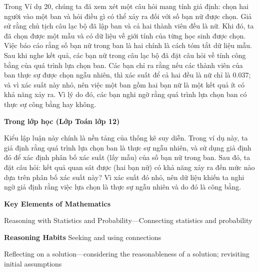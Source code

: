 \documentclass[
  10pt,
  a4paper,
  landscape,
  twoside,
  openany
]{scrbook}
\begin{document}
{
Trong Ví dụ 20, chúng ta đã xem xét một câu hỏi mang tính giả định: chọn hai người vào một ban và hỏi điều gì có thể xảy ra đối với số bạn nữ được chọn. Giả sử rằng chủ tịch câu lạc bộ đã lập ban và cả hai thành viên đều là nữ. Khi đó, ta đã chọn được một mẫu và có dữ liệu về giới tính của từng học sinh được chọn. Việc báo cáo rằng số bạn nữ trong ban là hai chính là cách tóm tắt dữ liệu mẫu. Sau khi nghe kết quả, các bạn nữ trong câu lạc bộ đã đặt câu hỏi về tính công bằng của quá trình lựa chọn ban. Các bạn chỉ ra rằng nếu các thành viên của ban thực sự được chọn ngẫu nhiên, thì xác suất để cả hai đều là nữ chỉ là $0.037$; và vì xác suất này nhỏ, nên việc một ban gồm hai bạn nữ là một kết quả ít có khả năng xảy ra. Vì lý do đó, các bạn nghi ngờ rằng quá trình lựa chọn ban có thực sự công bằng hay không.

\noindent
\textbf{Trong lớp học (Lớp Toán lớp 12)}

Kiểu lập luận này chính là nền tảng của thống kê suy diễn. Trong ví dụ này, ta giả định rằng quá trình lựa chọn ban là thực sự ngẫu nhiên, và sử dụng giả định đó để xác định phân bố xác suất (lấy mẫu) của số bạn nữ trong ban. Sau đó, ta đặt câu hỏi: kết quả quan sát được (hai bạn nữ) có khả năng xảy ra đến mức nào dựa trên phân bố xác suất này? Vì xác suất đó nhỏ, nên dữ liệu khiến ta nghi ngờ giả định rằng việc lựa chọn là thực sự ngẫu nhiên và do đó là công bằng.


\noindent
\textbf{Key Elements of Mathematics}

Reasoning with Statistics and Probability---Connecting statistics and probability

\noindent
\textbf{Reasoning Habits}
Seeking and using connections

Reflecting on a solution---considering the reasonableness of a solution; revisiting initial assumptions
}
\end{document}
